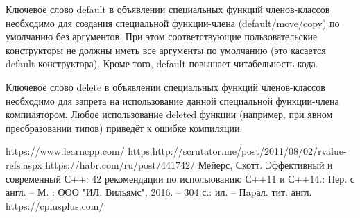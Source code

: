 \documentclass[a4paper,12pt]{article}	%
\begin{document}
	Ключевое слово default в объявлении специальных функций членов-классов необходимо для создания специальной функции-члена (default/move/copy) по умолчанию без аргументов. При этом соответствующие пользовательские конструкторы не должны иметь все аргументы по умолчанию (это касается default конструктора). Кроме того, default повышает читабельность кода.
	
	Ключевое слово delete в объявлении специальных функций членов-классов необходимо для запрета на использование данной специальной функции-члена компилятором. Любое использование deleted функции (например, при явном преобразовании типов) приведёт к ошибке компиляции.

\newpage

 
\begin{thebibliography}{}
     https://www.learncpp.com/
     https:http://scrutator.me/post/2011/08/02/rvalue-refs.aspx
     https://habr.com/ru/post/441742/
	 Мейерс, Скотт. Эффективный и современный С++: 42 рекомендации по исполыованию С++11 и С++14.: Пер. с англ. -- М. : ООО "ИЛ. Вильямс", 2016. -- 304 с.: ил. -- Пapал. тит. англ.
	 https://cplusplus.com/
    
\end{thebibliography}
\end{document}
